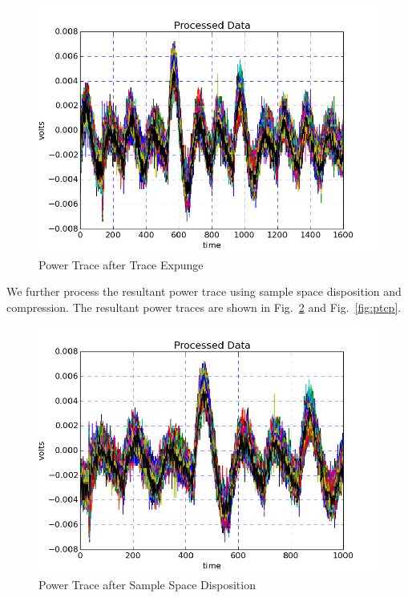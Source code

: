\begin{figure}[H]
\begin{center}
\includegraphics[scale=0.8]{figures/scaTrace2}
\caption{\label{fig:pttx}Power Trace after Trace Expunge}
\end{center} 
\vspace{-3ex}
\end{figure}

We further process the resultant power trace using sample space disposition and compression. The resultant
power traces are shown in Fig.~\ref{fig:ptsp} and Fig.~\ref{fig:ptcp}.

\begin{figure}[H]
\begin{center}
\includegraphics[scale=0.8]{figures/scaTrace3}
\caption{\label{fig:ptsp}Power Trace after Sample Space Disposition}
\end{center} 
\vspace{-3ex}
\end{figure}

